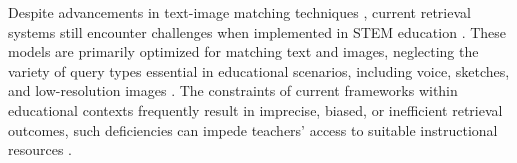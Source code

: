 
Despite advancements in text-image matching techniques \cite{intro12,intro11}, current retrieval systems still encounter challenges when implemented in STEM education \cite{li2025freestyleret}.
These models are primarily optimized for matching text and images, neglecting the variety of query types essential in educational scenarios, including voice, sketches, and low-resolution images \cite{intro6}.  
The constraints of current frameworks within educational contexts frequently result in imprecise, biased, or inefficient retrieval outcomes, such deficiencies can impede teachers' access to suitable instructional resources \cite{intro9}. 


